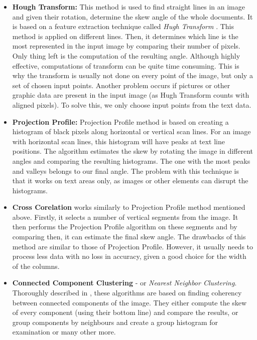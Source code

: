 \begin{itemize}

\item\textbf{Hough Transform:} This method is used to find straight lines in an image and given their rotation, determine the skew angle of the whole documents. It is based on a feature extraction technique called \emph{Hugh Transform} \citep{hughTransform}. This method is applied on different lines. Then, it determines which line is the most represented in the input image by comparing their number of pixels. Only thing left is the computation of the resulting angle. Although highly effective, computations of transform can be quite time consuming. This is why the transform is usually not done on every point of the image, but only a set of chosen input points. Another problem occurs if pictures or other graphic data are present in the input image (as Hugh Transform counts with aligned pixels). To solve this, we only choose input points from the text data.

\item\textbf{Projection Profile: } Projection Profile method is based on creating a histogram of black pixels along horizontal or vertical scan lines. For an image with horizontal scan lines, this histogram will have peaks at text line positions. The algorithm estimates the skew by rotating the image in different angles and comparing the resulting histograms. The one with the most peaks and valleys belongs to our final angle. The problem with this technique is that it works on text areas only, as images or other elements can disrupt the histograms.

\item\textbf{Cross Corelation} works similarly to Projection Profile method mentioned above. Firstly, it selects a number of vertical segments from the image. It then performs the Projection Profile algorithm on these segments and by comparing then, it can estimate the final skew angle. The drawbacks of this method are similar to those of Projection Profile. However, it usually needs to process less data with no loss in accuracy, given a good choice for the width of the columns.

\item\textbf{Connected Component Clustering} - or \emph{Nearest Neighbor Clustering}. Thoroughly described in \citet{skewClustering}, these algorithms are based on finding coherency between connected components of the image. They either compute the skew of every component (using their bottom line) and compare the results, or group components by neighbours and create a group histogram for examination or many other more.

\end{itemize}

